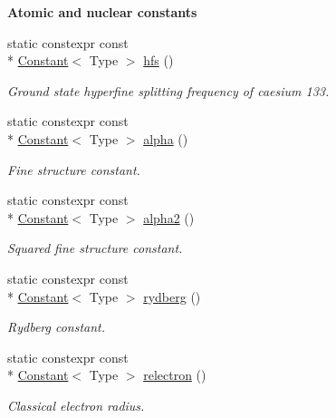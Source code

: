 \begin{Indent}{\bf Atomic and nuclear constants}\par
\begin{DoxyCompactItemize}
\item 
static constexpr const \\*
\hyperlink{exceptionmagrathea_1_1Constant}{Constant}$<$ Type $>$ \hyperlink{exceptionmagrathea_1_1Constants_a4e885f36b107cb801c0ae0fcb86f911f}{hfs} ()
\begin{DoxyCompactList}\small\item\em Ground state hyperfine splitting frequency of caesium 133. \end{DoxyCompactList}\item 
static constexpr const \\*
\hyperlink{exceptionmagrathea_1_1Constant}{Constant}$<$ Type $>$ \hyperlink{exceptionmagrathea_1_1Constants_a4983ddb272b9e557d2f317867f62d7f6}{alpha} ()
\begin{DoxyCompactList}\small\item\em Fine structure constant. \end{DoxyCompactList}\item 
static constexpr const \\*
\hyperlink{exceptionmagrathea_1_1Constant}{Constant}$<$ Type $>$ \hyperlink{exceptionmagrathea_1_1Constants_a9250d6ea8178b43e015145a47e0d73ec}{alpha2} ()
\begin{DoxyCompactList}\small\item\em Squared fine structure constant. \end{DoxyCompactList}\item 
static constexpr const \\*
\hyperlink{exceptionmagrathea_1_1Constant}{Constant}$<$ Type $>$ \hyperlink{exceptionmagrathea_1_1Constants_a7509ddaeaa8fd46326ad2ec36234c986}{rydberg} ()
\begin{DoxyCompactList}\small\item\em Rydberg constant. \end{DoxyCompactList}\item 
static constexpr const \\*
\hyperlink{exceptionmagrathea_1_1Constant}{Constant}$<$ Type $>$ \hyperlink{exceptionmagrathea_1_1Constants_ab3085c64fa706844800fbd511a85fd71}{relectron} ()
\begin{DoxyCompactList}\small\item\em Classical electron radius. \end{DoxyCompactList}\item 

\end{DoxyCompactItemize}
\end{Indent}
